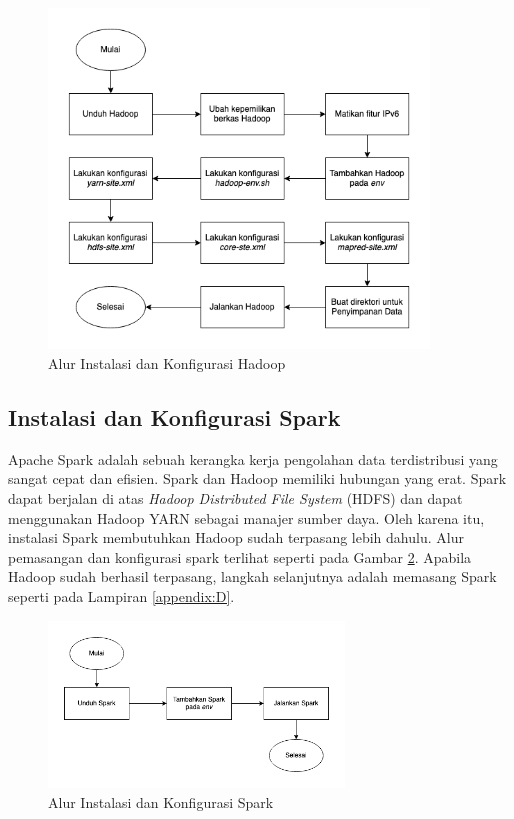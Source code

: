 \begin{figure}[h!]
    \centering
    \includegraphics[width=0.9\textwidth]{figures/ch03/hadoop-flow.png}
    \caption{Alur Instalasi dan Konfigurasi Hadoop}
    \label{fig:hadoop-flow}
\end{figure}

\subsection{Instalasi dan Konfigurasi Spark}
Apache Spark adalah sebuah kerangka kerja pengolahan data terdistribusi yang sangat cepat dan efisien. Spark dan Hadoop memiliki hubungan yang erat. Spark dapat berjalan di atas \textit{Hadoop Distributed File System} (HDFS) dan dapat menggunakan Hadoop YARN sebagai manajer sumber daya. Oleh karena itu, instalasi Spark membutuhkan Hadoop sudah terpasang lebih dahulu. Alur pemasangan dan konfigurasi spark terlihat seperti pada Gambar \ref{fig:spark-flow}. Apabila Hadoop sudah berhasil terpasang, langkah selanjutnya adalah memasang Spark seperti pada Lampiran \ref{appendix:D}.

\begin{figure}[h]
    \centering
    \includegraphics[width=0.7\textwidth]{figures/ch03/spark-flow.png}
    \caption{Alur Instalasi dan Konfigurasi Spark}
    \label{fig:spark-flow}
\end{figure}

